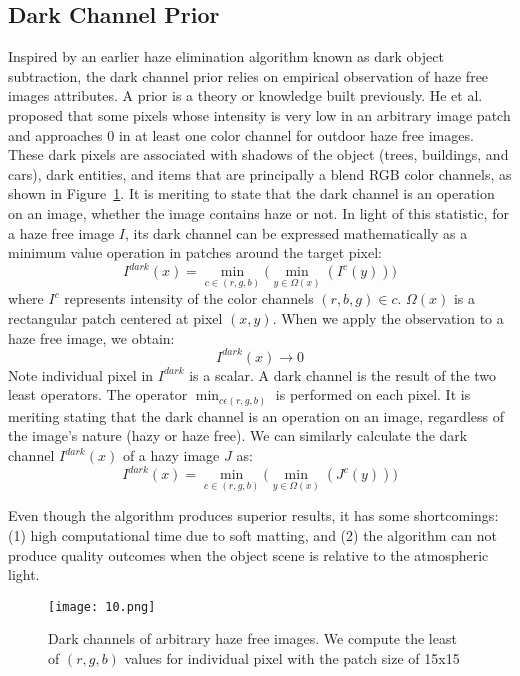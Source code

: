 \documentclass[doctor,english,listoffigures,listoftables]{thesis-uestc}
\begin{document}
\subsection{Dark Channel Prior}
Inspired by an earlier haze elimination algorithm known as dark object subtraction, the dark channel prior relies on empirical observation of haze free images attributes. A prior is a theory or knowledge built previously. He et al. proposed that some pixels whose intensity is very low in an arbitrary image patch and approaches 0 in at least one color channel for outdoor haze free images. These dark pixels are associated with shadows of the object (trees, buildings, and cars), dark entities, and items that are principally a blend RGB color channels, as shown in Figure~\ref{fig10}. It is meriting to state that the dark channel is an operation on an image, whether the image contains haze or not. In light of this statistic, for a haze free image $I$, its dark channel can be expressed mathematically as a minimum value operation in patches around the target pixel:  
\begin{equation}
	I^{dark}(x)=\min_{c\in(r,g,b)} \bigg(\min_{y\in\Omega(x)}(I^c(y))\bigg)
\end{equation}
where $I^c$ represents intensity of the color channels ${(r,b,g) \in c}$. $\Omega(x)$ is a rectangular patch centered at pixel $(x,y)$. When we apply the observation to a haze free image, we obtain:
\begin{equation}
	I^{dark}(x) \rightarrow 0
\end{equation}
Note individual pixel in $I^{dark}$ is a scalar. A dark channel is the result of the two least operators. The operator $\min_{c\epsilon(r,g,b)}$ is performed on each pixel. It is meriting stating that the dark channel is an operation on an image, regardless of the image's nature (hazy or haze free). We can similarly calculate the dark channel $I^{dark}(x)$ of a hazy image $J$ as: 
\begin{equation}
	I^{dark}(x)=\min_{c\in(r,g,b)} \bigg(\min_{y\in\Omega(x)}(J^c(y))\bigg)
\end{equation}

Even though the algorithm produces superior results, it has some shortcomings: (1) high computational time due to soft matting, and (2) the algorithm can not produce quality outcomes when the object scene is relative to the atmospheric light. 

\begin{figure}[H]
	\centering
	\texttt{[image: 10.png]}
	\caption{Dark channels of arbitrary haze free images. We compute the least of $(r, g, b)$ values for individual pixel with the patch size of 15x15}
	\label{fig10}
\end{figure}
\end{document}
